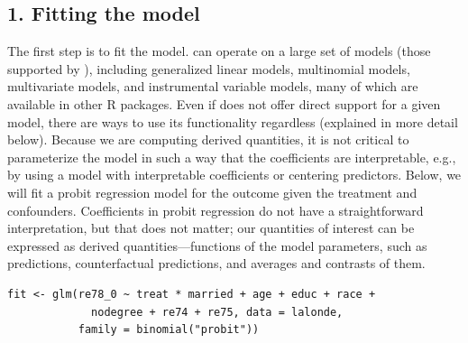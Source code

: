\subsection{1. Fitting the model}\label{fitting-the-model}
The first step is to fit the model.  can operate on a large set of models (those supported by ), including generalized linear models, multinomial models, multivariate models, and instrumental variable models, many of which are available in other R packages. Even if  does not offer direct support for a given model, there are ways to use its functionality regardless (explained in more detail below).
Because we are computing derived quantities, it is not critical to parameterize the model in such a way that the coefficients are interpretable, e.g., by using a model with interpretable coefficients or centering predictors. Below, we will fit a probit regression model for the outcome given the treatment and confounders. Coefficients in probit regression do not have a straightforward interpretation, but that does not matter; our quantities of interest can be expressed as derived quantities---functions of the model parameters, such as predictions, counterfactual predictions, and averages and contrasts of them.
\begin{verbatim}
fit <- glm(re78_0 ~ treat * married + age + educ + race +
             nodegree + re74 + re75, data = lalonde,
           family = binomial("probit"))
\end{verbatim}
